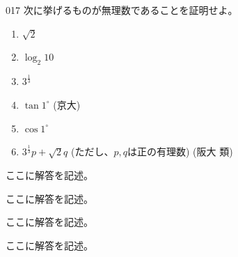 \begin{prob}{017}{}{}
 次に挙げるものが無理数であることを証明せよ。
 \begin{enumerate}
  \item $\sqrt{2}$ 
  \item $\log_2 10$  
  \item $3^{\frac{1}{3}}$ 
  \item $\tan 1^\circ$  (京大)
  \item $\cos 1^\circ$ 
  \item $3^{\frac{1}{3}}p+\sqrt{2}q$ (ただし、$p, q$は正の有理数)  (阪大 類)
 \end{enumerate}
\end{prob}
ここに解答を記述。

ここに解答を記述。

ここに解答を記述。

ここに解答を記述。